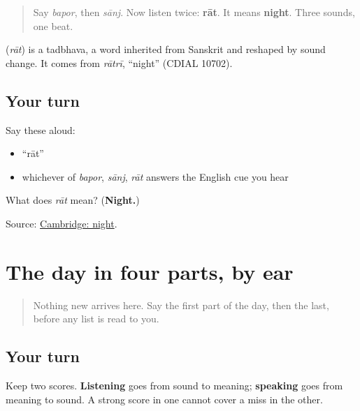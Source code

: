 \label{lesson:GU-C24-hear-raat}



\begin{quote}
Say \emph{bapor}, then \emph{sānj}. Now listen twice: \textbf{rāt}. It means \textbf{night}. Three sounds, one beat.
\end{quote}

\begin{cousinweb}
\textbf{} (\emph{rāt}) is a tadbhava, a word inherited from Sanskrit and reshaped by sound change. It comes from \emph{rātrī}, \textquotedblleft{}night\textquotedblright{} (CDIAL 10702).
\end{cousinweb}

\subsection*{Your turn}
Say these aloud:

\begin{itemize}
\raggedright
  \item \textquotedblleft{}rāt\textquotedblright{}
  \item whichever of \emph{bapor}, \emph{sānj}, \emph{rāt} answers the English cue you hear
\end{itemize}

\begin{tcolorbox}[breakable,colback=teal!4,colframe=teal!35!black,title={Before you move on}]
What does \emph{rāt} mean? (\textbf{Night.})

Source: \href{https://dictionary.cambridge.org/dictionary/english-gujarati/night}{Cambridge: night}.
\end{tcolorbox}
\section[Practice]{The day in four parts, by ear}

\label{lesson:GU-C24-day-parts-four}



\begin{quote}
Nothing new arrives here. Say the first part of the day, then the last, before any list is read to you.
\end{quote}

\subsection*{Your turn}
Keep two scores. \textbf{Listening} goes from sound to meaning; \textbf{speaking} goes from meaning to sound. A strong score in one cannot cover a miss in the other.

